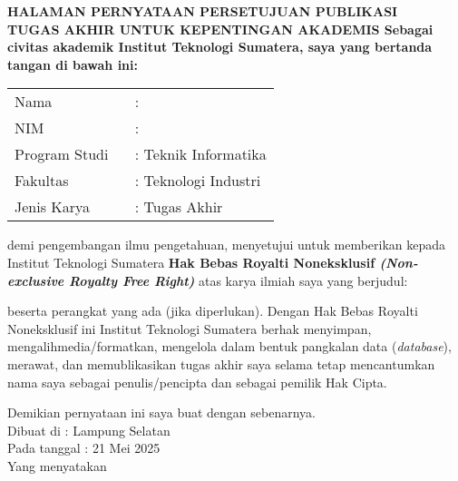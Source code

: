 \clearpage
{}%

\begin{center}
	\smallskip
	
	\normalsize \bfseries \MakeUppercase{
		HALAMAN PERNYATAAN PERSETUJUAN PUBLIKASI \\
		TUGAS AKHIR UNTUK KEPENTINGAN AKADEMIS
	}
	\vspace{0.3cm}
	\normalfont \onehalfspacing \justifying %
	Sebagai civitas akademik Institut Teknologi Sumatera, saya yang bertanda tangan di bawah ini:
	
	\flushleft
	\setlength{\tabcolsep}{0pt}
	\begin{tabular}{l l}
		Nama 			&  : \theauthor\\
		NIM 			&  : \printnim\\
		Program Studi \	&  : Teknik Informatika\\
		Fakultas 		&  : Teknologi Industri\\
		Jenis Karya 	&  : Tugas Akhir\\
	\end{tabular}

	\justifying
	\noindent demi pengembangan ilmu pengetahuan, menyetujui untuk memberikan kepada Institut Teknologi Sumatera \textbf{Hak Bebas Royalti Noneksklusif \textit{(Non-exclusive Royalty Free Right)}} atas karya ilmiah saya yang berjudul:
	
	\centering
	\textbf{\thetitle}
	
	\justifying
	beserta perangkat yang ada (jika diperlukan). Dengan Hak Bebas Royalti Noneksklusif ini Institut Teknologi Sumatera berhak menyimpan, mengalihmedia/formatkan, mengelola dalam bentuk pangkalan data (\textit{database}), merawat, dan memublikasikan tugas akhir saya selama tetap mencantumkan nama saya sebagai penulis/pencipta dan sebagai pemilik Hak Cipta.
	
	Demikian pernyataan ini saya buat dengan sebenarnya. \\
	\centering
	Dibuat di : Lampung Selatan\\
	Pada tanggal : 21 Mei 2025\\ %
	Yang menyatakan\\
	\vspace{1.5cm}
	\theauthor
	
\end{center}
\clearpage